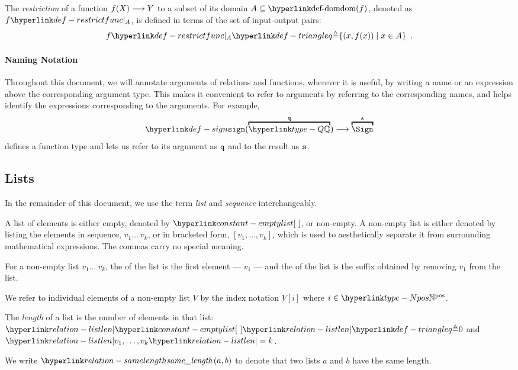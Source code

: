 \begin{definition}
\hypertarget{def-restrictfunc}{}
The \emph{restriction} of a function $f(X) \longrightarrow Y$ to a subset of its domain
$A \subseteq \dom(f)$, denoted as $\restrictfunc{f}{A}$, is defined
in terms of the set of input-output pairs:
\[
  \restrictfunc{f}{A} \triangleq \{ (x, f(x)) \;|\; x \in A \} \enspace.
\]
\end{definition}

\paragraph{Naming Notation}
Throughout this document, we will annotate arguments of relations and functions, wherever it is useful,
by writing a name or an expression above the corresponding argument type.
This makes it convenient to refer to arguments by referring to the corresponding names, and helps identify
the expressions corresponding to the arguments.
For example,
\[
\sign(\overname{\Q}{\vq}) \aslto \overname{\Sign}{\vs}
\]
defines a function type and lets us refer to its argument as $\texttt{q}$
and to the result as $\texttt{s}$.

\subsection{Lists}
In the remainder of this document, we use the term \emph{list} and \emph{sequence} interchangeably.

A list of elements \hypertarget{constant-emptylist}{is either empty, denoted by $\emptylist$}, or non-empty.
A non-empty list is either denoted by listing the elements in sequence, $v_1 \ldots\ v_k$,
or in bracketed form, $[v_1,\ldots,v_k]$, which is used to aesthetically separate it from surrounding mathematical expressions.
The commas carry no special meaning.

\hypertarget{def-head}{}
\hypertarget{def-tail}{}
For a non-empty list $v_1 \ldots\ v_k$, the \emph{\head} of the list is the first element --- $v_1$ ---
and the \emph{\tail} of the list is the suffix obtained by removing $v_1$ from the list.

We refer to individual elements of a non-empty list $V$ by the index notation $V[i]$ where $i\in\Npos$.

\begin{definition}
\hypertarget{relation-listlen}{}
The \emph{length} of a list is the number of elements in that list:
$\listlen{\emptylist} \triangleq 0$ and $\listlen{v_1,\ldots,v_k}=k$.
\end{definition}
We write $\samelengthop[H]{a}{b}$ to denote that two lists $a$ and $b$ have the same length.

